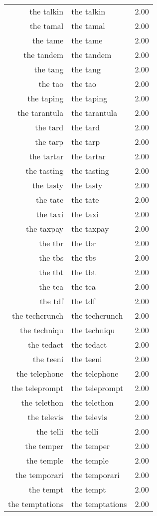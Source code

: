 \begin{table}[ht]
\begin{tabular}{rlr}
  the talkin & the talkin & 2.00 \\ 
  the tamal & the tamal & 2.00 \\ 
  the tame & the tame & 2.00 \\ 
  the tandem & the tandem & 2.00 \\ 
  the tang & the tang & 2.00 \\ 
  the tao & the tao & 2.00 \\ 
  the taping & the taping & 2.00 \\ 
  the tarantula & the tarantula & 2.00 \\ 
  the tard & the tard & 2.00 \\ 
  the tarp & the tarp & 2.00 \\ 
  the tartar & the tartar & 2.00 \\ 
  the tasting & the tasting & 2.00 \\ 
  the tasty & the tasty & 2.00 \\ 
  the tate & the tate & 2.00 \\ 
  the taxi & the taxi & 2.00 \\ 
  the taxpay & the taxpay & 2.00 \\ 
  the tbr & the tbr & 2.00 \\ 
  the tbs & the tbs & 2.00 \\ 
  the tbt & the tbt & 2.00 \\ 
  the tca & the tca & 2.00 \\ 
  the tdf & the tdf & 2.00 \\ 
  the techcrunch & the techcrunch & 2.00 \\ 
  the techniqu & the techniqu & 2.00 \\ 
  the tedact & the tedact & 2.00 \\ 
  the teeni & the teeni & 2.00 \\ 
  the telephone & the telephone & 2.00 \\ 
  the teleprompt & the teleprompt & 2.00 \\ 
  the telethon & the telethon & 2.00 \\ 
  the televis & the televis & 2.00 \\ 
  the telli & the telli & 2.00 \\ 
  the temper & the temper & 2.00 \\ 
  the temple & the temple & 2.00 \\ 
  the temporari & the temporari & 2.00 \\ 
  the tempt & the tempt & 2.00 \\ 
  the temptations & the temptations & 2.00 \\ 

\end{tabular}
\end{table}
